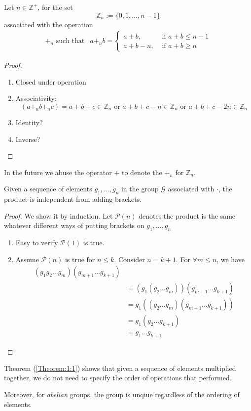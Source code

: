 \begin{proposition}
Let $n\in\mathbb{Z}^+$, for the set 
\[
\mathbb{Z}_n:=\{0,1,\dots,n-1\}
\]
associated with the operation
\[
\begin{array}{ll}
{+_n}\mbox{ such that}
&
a{+_n}b=\left\{
\begin{aligned}
a+b, &\mbox{ if $a+b\le n-1$}
\\
a+b -n , &\mbox{ if $a+b\ge n$}
\end{aligned}
\right.
\end{array}
\]
\end{proposition}
\begin{proof}
\begin{enumerate}
\item
Closed under operation
\item
Associativity: 
\[
(a+_n b+_n c) = a+b+c\in\mathbb{Z}_n\mbox{ or }a+b+c -n\in\mathbb{Z}_n\mbox{ or }a+b+c-2n\in\mathbb{Z}_n
\]
\item
Identity?
\item
Inverse?
\end{enumerate}
\end{proof}
In the future we abuse the operator $+$ to denote the $+_n$ for $\mathbb{Z}_n$.
\begin{theorem}\label{Theorem:1:1}
Given a sequence of elements $g_1,\dots,g_n$ in the group $\mathcal{G}$ associated with $\cdot$, the product is independent from adding brackets.
\end{theorem}
\begin{proof}
We show it by induction. Let $\mathcal{P}(n)$ denotes the product is the same whatever different ways of putting brackets on $g_1,\dots,g_n$
\begin{enumerate}
\item
Easy to verify $\mathcal{P}(1)$ is true.
\item
Assume $\mathcal{P}(n)$ is true for $n\le k$. Consider $n=k+1$. For $\forall m\le  n$, we have
\begin{align*}
(g_1g_2\dots g_m)(g_{m+1}\dots g_{k+1})&
\\
&=(g_1(g_2\dots g_m))(g_{m+1}\dots g_{k+1})\\
&=g_1((g_2\dots g_m)(g_{m+1}\dots g_{k+1}))\\
&=g_1(g_2\dots g_{k+1})\\
&=g_1\dots g_{k+1}
\end{align*}
\end{enumerate}
\end{proof}
\begin{remark}
Theorem (\ref{Theorem:1:1}) shows that given a sequence of elements multiplied together, we do not need to specify the order of operations that performed.

Moreover, for \emph{abelian} groups, the group is unqiue regardless of the ordering of elements.
\end{remark}

